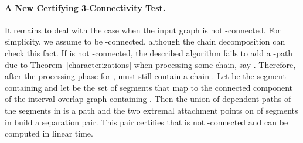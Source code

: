 \paragraph{A New Certifying 3-Connectivity Test.}\label{test}
It remains to deal with the case when the input graph  is not -connected. For simplicity, we assume  to be -connected, although the chain decomposition can check this fact. If  is not -connected, the described algorithm fails to add a \BG-path due to Theorem~\ref{characterizations} when processing some chain, say . Therefore, after the processing phase for ,  must still contain a chain . Let  be the segment containing  and let  be the set of segments that map to the connected component of the interval overlap graph containing . Then the union of dependent paths of the segments in  is a path  and the two extremal attachment points on  of segments in  build a separation pair. This pair certifies that  is not -connected and can be computed in linear time.